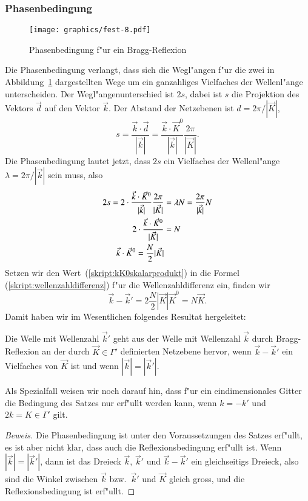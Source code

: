\subsubsection{Phasenbedingung}
\begin{figure}
\centering
\texttt{[image: graphics/fest-8.pdf]}
\caption{Phasenbedingung f"ur ein Bragg-Reflexion
\label{skript:phasenbedingung}}
\end{figure}
Die Phasenbedingung verlangt, dass sich die Wegl"angen f"ur die zwei in
Abbildung~\ref{skript:phasenbedingung} dargestellten Wege um ein
ganzahliges Vielfaches der Wellenl"ange unterscheiden.
Der Wegl"angenunterschied ist $2s$, dabei ist $s$ die Projektion des
Vektors $\vec d$ auf den Vektor $\vec k$. Der Abstand der Netzebenen
ist $d=2\pi / |\vec K|$,
\[
s
=
\frac{\vec k\cdot \vec d}{|\vec k|}
=
\frac{\vec k\cdot \vec K^0}{|\vec k|}\frac{2\pi}{|\vec K|}.
\]
Die Phasenbedingung lautet jetzt, dass $2s$ ein Vielfaches der Wellenl"ange
$\lambda = 2\pi/|\vec k|$ sein muss, also
\begin{align}
2s
=
2\cdot \frac{\vec k\cdot \vec K^0}{|\vec k|}\frac{2\pi}{|\vec K|}
&=
\lambda N
=
\frac{2\pi}{|\vec k|} N
\notag
\\
2\cdot \frac{\vec k\cdot \vec K^0}{|\vec K|}
&=
N
\notag
\\
\vec k\cdot \vec K^0=\frac{N}2 |\vec K|
\label{skript:kK0skalarprodukt}
\end{align}
Setzen wir den Wert~(\ref{skript:kK0skalarprodukt}) in die Formel
(\ref{skript:wellenzahldifferenz})
f"ur die Wellenzahldifferenz ein, finden wir
\[
\vec k-\vec k'=2 \frac{N}2 |\vec K|\vec K^0=N\vec K.
\]
Damit haben wir im Wesentlichen folgendes Resultat hergeleitet:
\begin{satz}
\label{skript:braggsatz}
Die Welle mit Wellenzahl $\vec k'$ geht aus der Welle mit Wellenzahl
$\vec k$ durch
Bragg-Reflexion an der durch $\vec K\in\Gamma'$ definierten Netzebene
hervor, wenn $\vec k-\vec k'$ ein Vielfaches von $\vec K$ ist und
wenn $|\vec k|=|\vec k'|$.
\end{satz}

Als Spezialfall weisen wir noch darauf hin, dass f"ur ein eindimensionales
Gitter die Bedingung des Satzes nur erf"ullt werden kann, wenn
$k=-k'$ und $2k=K\in\Gamma'$ gilt.

\begin{proof}[Beweis]
Die Phasenbedingung ist unter den Voraussetzungen des Satzes erf"ullt,
es ist aber nicht klar, dass auch die Reflexionsbedingung erf"ullt ist.
Wenn $|\vec k|=|\vec k'|$, dann ist das Dreieck $\vec k$, $\vec k'$
und $\vec k- \vec k'$ ein gleichseitigs Dreieck, also sind die Winkel
zwischen $\vec k$ bzw.~$\vec k'$ und $\vec K$ gleich gross, und die
Reflexionsbedingung ist erf"ullt.
\end{proof}

